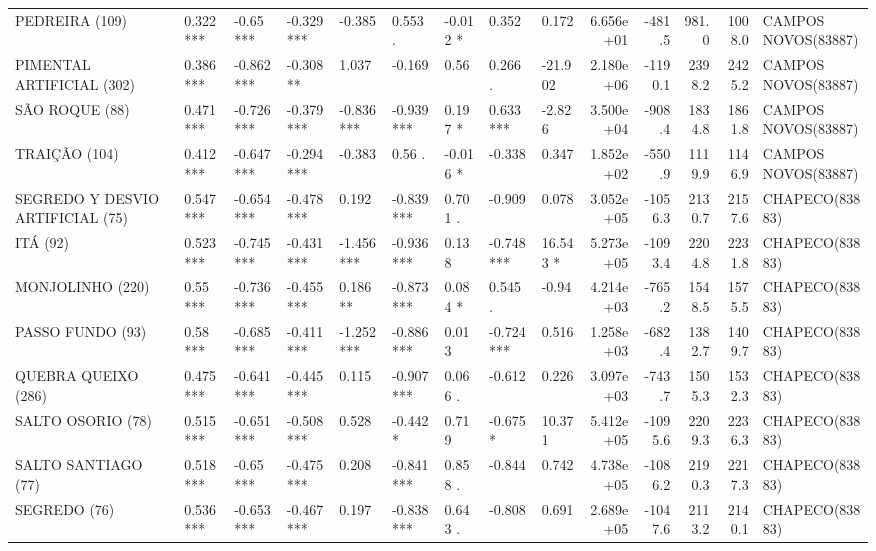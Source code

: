 \documentclass[12pt,oneside]{book}\usepackage[]{graphicx}\usepackage[]{color}
\newenvironment{knitrout}{}{} %
\theoremstyle{definition} %
\begin{document}
\begin{knitrout}
\begin{landscape}
\begin{table}
{\begin{tabular}[t]{lllllllllrrrrl}
PEDREIRA (109) & 0.322 *** & -0.65 *** & -0.329 *** & -0.385 & 0.553 . & -0.012 * & 0.352 & 0.172 & 6.656e+01 & -481.5 & 981.0 & 1008.0 & CAMPOS NOVOS(83887)\\
\addlinespace
\rowcolor{gray!6}  PIMENTAL ARTIFICIAL (302) & 0.386 *** & -0.862 *** & -0.308 ** & 1.037 & -0.169 & 0.56 & 0.266 . & -21.902 & 2.180e+06 & -1190.1 & 2398.2 & 2425.2 & CAMPOS NOVOS(83887)\\
SÃO ROQUE (88) & 0.471 *** & -0.726 *** & -0.379 *** & -0.836 *** & -0.939 *** & 0.197 * & 0.633 *** & -2.826 & 3.500e+04 & -908.4 & 1834.8 & 1861.8 & CAMPOS NOVOS(83887)\\
\rowcolor{gray!6}  TRAIÇÃO (104) & 0.412 *** & -0.647 *** & -0.294 *** & -0.383 & 0.56 . & -0.016 * & -0.338 & 0.347 & 1.852e+02 & -550.9 & 1119.9 & 1146.9 & CAMPOS NOVOS(83887)\\
SEGREDO Y DESVIO ARTIFICIAL (75) & 0.547 *** & -0.654 *** & -0.478 *** & 0.192 & -0.839 *** & 0.701 . & -0.909 & 0.078 & 3.052e+05 & -1056.3 & 2130.7 & 2157.6 & CHAPECO(83883)\\
\rowcolor{gray!6}  ITÁ (92) & 0.523 *** & -0.745 *** & -0.431 *** & -1.456 *** & -0.936 *** & 0.138 & -0.748 *** & 16.543 * & 5.273e+05 & -1093.4 & 2204.8 & 2231.8 & CHAPECO(83883)\\
\addlinespace
MONJOLINHO (220) & 0.55 *** & -0.736 *** & -0.455 *** & 0.186 ** & -0.873 *** & 0.084 * & 0.545 . & -0.94 & 4.214e+03 & -765.2 & 1548.5 & 1575.5 & CHAPECO(83883)\\
\rowcolor{gray!6}  PASSO FUNDO (93) & 0.58 *** & -0.685 *** & -0.411 *** & -1.252 *** & -0.886 *** & 0.013 & -0.724 *** & 0.516 & 1.258e+03 & -682.4 & 1382.7 & 1409.7 & CHAPECO(83883)\\
QUEBRA QUEIXO (286) & 0.475 *** & -0.641 *** & -0.445 *** & 0.115 & -0.907 *** & 0.066 . & -0.612 & 0.226 & 3.097e+03 & -743.7 & 1505.3 & 1532.3 & CHAPECO(83883)\\
\rowcolor{gray!6}  SALTO OSORIO (78) & 0.515 *** & -0.651 *** & -0.508 *** & 0.528 & -0.442 * & 0.719 & -0.675 * & 10.371 & 5.412e+05 & -1095.6 & 2209.3 & 2236.3 & CHAPECO(83883)\\
SALTO SANTIAGO (77) & 0.518 *** & -0.65 *** & -0.475 *** & 0.208 & -0.841 *** & 0.858 . & -0.844 & 0.742 & 4.738e+05 & -1086.2 & 2190.3 & 2217.3 & CHAPECO(83883)\\
\addlinespace
\rowcolor{gray!6}  SEGREDO (76) & 0.536 *** & -0.653 *** & -0.467 *** & 0.197 & -0.838 *** & 0.643 . & -0.808 & 0.691 & 2.689e+05 & -1047.6 & 2113.2 & 2140.1 & CHAPECO(83883)\\

\end{tabular}}
\end{table}
\end{landscape}
\end{knitrout}
\end{document}
